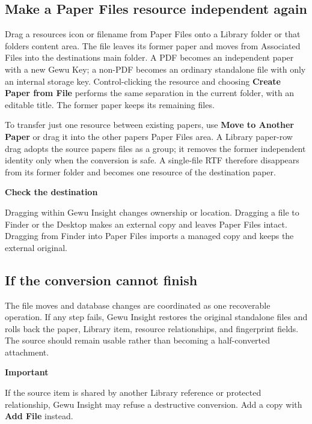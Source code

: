 \documentclass[10pt,letterpaper,oneside]{scrreprt}
\renewenvironment{quote}
  {\Needspace{5\baselineskip}\begin{tcolorbox}[enhanced,breakable,colback=GewuPale,colframe=GewuPale,boxrule=0pt,
    borderline west={1.6pt}{0pt}{GewuBlue},arc=1.2mm,left=2.5mm,right=2.5mm,top=1.7mm,bottom=1.7mm,
    before skip=4pt,after skip=5pt,fontupper=\color{GewuInk}\small]}
  {\end{tcolorbox}}
\begin{document}
\subsection{Make a Paper Files resource independent again}\label{make-a-paper-files-resource-independent-again}

Drag a resource\textquotesingle s icon or filename from Paper Files onto a Library folder or that folder\textquotesingle s content area. The file leaves its former paper and moves from Associated Files into the destination\textquotesingle s main folder. A PDF becomes an independent paper with a new Gewu Key; a non-PDF becomes an ordinary standalone file with only an internal storage key. Control-clicking the resource and choosing \textbf{Create Paper from File} performs the same separation in the current folder, with an editable title. The former paper keeps its remaining files.

To transfer just one resource between existing papers, use \textbf{Move to Another Paper} or drag it into the other paper\textquotesingle s Paper Files area. A Library paper-row drag adopts the source paper\textquotesingle s files as a group; it removes the former independent identity only when the conversion is safe. A single-file RTF therefore disappears from its former folder and becomes one resource of the destination paper.

\begin{quote}
\textbf{Check the destination}

Dragging within Gewu Insight changes ownership or location. Dragging a file to Finder or the Desktop makes an external copy and leaves Paper Files intact. Dragging from Finder into Paper Files imports a managed copy and keeps the external original.
\end{quote}

\subsection{If the conversion cannot finish}\label{if-the-conversion-cannot-finish}

The file moves and database changes are coordinated as one recoverable operation. If any step fails, Gewu Insight restores the original standalone files and rolls back the paper, Library item, resource relationships, and fingerprint fields. The source should remain usable rather than becoming a half-converted attachment.

\begin{quote}
\textbf{Important}

If the source item is shared by another Library reference or protected relationship, Gewu Insight may refuse a destructive conversion. Add a copy with \textbf{Add File} instead.
\end{quote}
\end{document}
